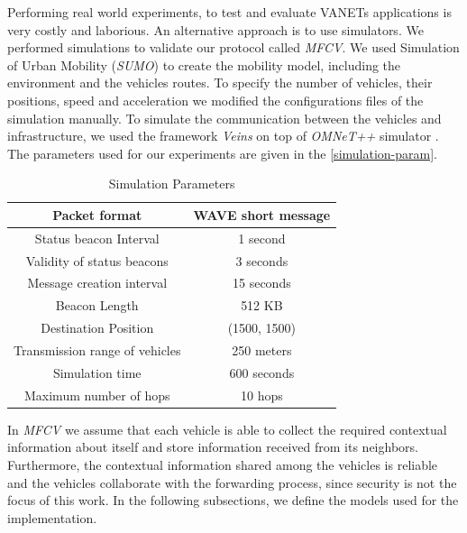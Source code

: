 \documentclass[letterpaper, 10 pt, conference]{ieeeconf}  %
\begin{document}
Performing real world experiments, to test and evaluate VANETs applications is very costly and laborious. An alternative approach is to use simulators. We performed simulations to validate our protocol called \emph{MFCV}. We used Simulation of Urban Mobility (\emph{SUMO}) \cite{SUMO-2012} to create the mobility model, including the environment and the vehicles routes. To specify the number of vehicles, their positions, speed and acceleration we modified the configurations files of the simulation manually. To simulate the communication between the vehicles and infrastructure, we used the framework \emph{Veins} \cite{veins2016} on top of \emph{OMNeT++} simulator \cite{omnet2016}. The parameters used for our experiments are given in the \autoref{simulation-param}.

\begin{table}[ht]
    \center
    \caption{Simulation Parameters} \label{simulation-param}
    \begin{tabular}{|c|c|}
        \hline
        Packet format                  & WAVE short message \\ \hline
        Status beacon Interval         & 1 second           \\ \hline
        Validity of status beacons     & 3 seconds          \\ \hline
        Message creation interval      & 15 seconds         \\ \hline
        Beacon Length                  & 512 KB             \\ \hline
        Destination Position           & (1500, 1500)       \\ \hline
        Transmission range of vehicles & 250 meters         \\ \hline
        Simulation time                & 600 seconds        \\ \hline
        Maximum number of hops         & 10 hops            \\ \hline
    \end{tabular}
\end{table}

In \emph{MFCV} we assume that each vehicle is able to collect the required contextual information about itself and store information received from its neighbors. Furthermore, the contextual information shared among the vehicles is reliable and the vehicles collaborate with the forwarding process, since security is not the focus of this work. In the following subsections, we define the models used for the implementation.
\end{document}
